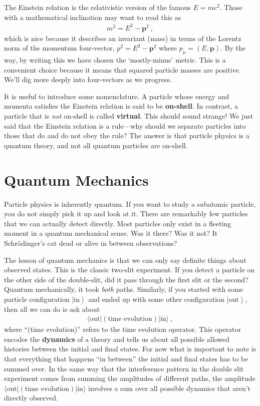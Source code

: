 \documentclass[12pt]{article}
\numberwithin{equation}{section}    %
\renewcommand{\vec}[1]{\mathbf{#1}} %
\begin{document}
The Einstein relation is the relativistic version of the famous $E=mc^2$. Those with a mathematical inclination may want to read this as
\begin{align}
	m^2 = E^2 - \vec{p}^2 \ ,
\end{align}
which is nice because it describes an invariant (mass) in terms of the Lorentz norm of the momentum four-vector, $p^2 = E^2-\vec p^2$ where $p_\mu = (E, \vec p)$. By the way, by writing this we have chosen the `mostly-minus' metric. This is a convenient choice because it means that squared particle masses are positive. We'll dig more deeply into four-vectors as we progress. 

It is useful to introduce some nomenclature. A particle whose energy and momenta satisfies the Einstein relation is said to be \textbf{on-shell}. In contrast, a particle that is \emph{not} on-shell is called \textbf{virtual}. This should sound strange! We just said that the Einstein relation is a rule---why should we separate particles into those that do and do not obey the rule? The answer is that particle physics is a quantum theory, and not all quantum particles are on-shell.

\section{Quantum Mechanics}

Particle physics is inherently quantum. If you want to study a subatomic particle, you do not simply pick it up and look at it. 
%
There are remarkably few particles that we can actually detect directly. Most particles only exist in a fleeting moment in a quantum mechanical sense. Was it there? Was it not? It Schr\"odinger's cat dead or alive in between observations?

The lesson of quantum mechanics is that we can only say definite things about observed states. This is the classic two-slit experiment. If you detect a particle on the other side of the double-slit, did it pass through the first slit or the second? Quantum mechanically, it took \emph{both} paths. Similarly, if you started with some particle configuration $\left|\text{in}\right\rangle$ and ended up with some other configuration $\left|\text{out}\right\rangle$, then all we can do is ask about
\begin{align}
	\langle \text{out} | (\text{time evolution}) | \text{in}\rangle \ ,
\end{align}
where ``(time evolution)'' refers to the time evolution operator. This operator encodes the \textbf{dynamics} of a theory and tells us about all possible allowed histories between the initial and final states. For now what is important to note is that everything that happens ``in between'' the initial and final states has to be summed over. In the same way that the interference pattern in the double slit experiment comes from summing the amplitudes of different paths, the amplitude $\langle \text{out} | (\text{time evolution}) | \text{in}\rangle $ involves a sum over all possible dynamics that aren't directly observed. 
\end{document}
